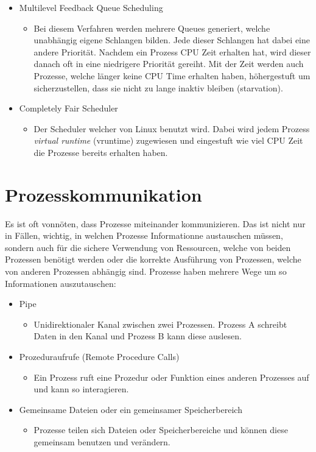 \documentclass{article}
\begin{document}
\begin{itemize}
\begin{itemize}
		\end{itemize}
		\item{Multilevel Feedback Queue Scheduling}
		\begin{itemize}
			\item{Bei diesem Verfahren werden mehrere Queues generiert, welche unabhängig eigene Schlangen bilden. Jede dieser Schlangen hat dabei eine andere Priorität. Nachdem ein Prozess CPU Zeit erhalten hat, wird dieser danach oft in eine niedrigere Priorität gereiht. Mit der Zeit werden auch Prozesse, welche länger keine CPU Time erhalten haben, höhergestuft um sicherzustellen, dass sie nicht zu lange inaktiv bleiben (starvation).}
		\end{itemize}
		\item{Completely Fair Scheduler}
		\begin{itemize}
			\item{Der Scheduler welcher von Linux benutzt wird. Dabei wird jedem Prozess \textit{virtual runtime} (vruntime) zugewiesen und eingestuft wie viel CPU Zeit die Prozesse bereits erhalten haben.}
		\end{itemize}
	\end{itemize}
	 \section{Prozesskommunikation}
	 Es ist oft vonnöten, dass Prozesse miteinander kommunizieren. Das ist nicht nur in Fällen, wichtig, in welchen Prozesse Informationne austauschen müssen, sondern auch für die sichere Verwendung von Ressourcen, welche von beiden Prozessen benötigt werden oder die korrekte Ausführung von Prozessen, welche von anderen Prozessen abhängig sind. Prozesse haben mehrere Wege um so Informationen auszutauschen:
	 \begin{itemize}
	 	\item{Pipe}
	 	\begin{itemize}
	 		\item{Unidirektionaler Kanal zwischen zwei Prozessen. Prozess A schreibt Daten in den Kanal und Prozess B kann diese auslesen.}
	 	\end{itemize}
	 	\item{Prozeduraufrufe (Remote Procedure Calls)}
	 	\begin{itemize}
	 		\item{Ein Prozess ruft eine Prozedur oder Funktion eines anderen Prozesses auf und kann so interagieren.}
	 	\end{itemize}
	 	\item{Gemeinsame Dateien oder ein gemeinsamer Speicherbereich}
	 	\begin{itemize}
	 		\item{Prozesse teilen sich Dateien oder Speicherbereiche und können diese gemeinsam benutzen und verändern.}
	 	\end{itemize}
	 \end{itemize}     
\end{document}
